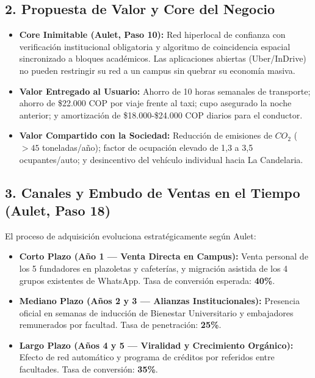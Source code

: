 \documentclass[11pt,a4paper]{article}
\begin{document}
\subsection{2. Propuesta de Valor y Core del Negocio}
\begin{itemize}[leftmargin=*]
    \item \textbf{Core Inimitable (Aulet, Paso 10):} Red hiperlocal de confianza con verificaci\'on institucional obligatoria y algoritmo de coincidencia espacial sincronizado a bloques acad\'emicos. Las aplicaciones abiertas (Uber/InDrive) no pueden restringir su red a un campus sin quebrar su econom\'ia masiva.
    \item \textbf{Valor Entregado al Usuario:} Ahorro de 10 horas semanales de transporte; ahorro de \$22.000 COP por viaje frente al taxi; cupo asegurado la noche anterior; y amortizaci\'on de \$18.000-\$24.000 COP diarios para el conductor.
    \item \textbf{Valor Compartido con la Sociedad:} Reducci\'on de emisiones de $CO_2$ ($>45$ toneladas/a\~no); factor de ocupaci\'on elevado de 1,3 a 3,5 ocupantes/auto; y desincentivo del veh\'iculo individual hacia La Candelaria.
\end{itemize}

\subsection{3. Canales y Embudo de Ventas en el Tiempo (Aulet, Paso 18)}
El proceso de adquisici\'on evoluciona estrat\'egicamente seg\'un Aulet:
\begin{itemize}[leftmargin=*]
    \item \textbf{Corto Plazo (A\~no 1 --- Venta Directa en Campus):} Venta personal de los 5 fundadores en plazoletas y cafeter\'ias, y migraci\'on asistida de los 4 grupos existentes de WhatsApp. Tasa de conversi\'on esperada: \textbf{40\%}.
    \item \textbf{Mediano Plazo (A\~nos 2 y 3 --- Alianzas Institucionales):} Presencia oficial en semanas de inducci\'on de Bienestar Universitario y embajadores remunerados por facultad. Tasa de penetraci\'on: \textbf{25\%}.
    \item \textbf{Largo Plazo (A\~nos 4 y 5 --- Viralidad y Crecimiento Org\'anico):} Efecto de red autom\'atico y programa de cr\'editos por referidos entre facultades. Tasa de conversi\'on: \textbf{35\%}.
\end{itemize}
\end{document}
